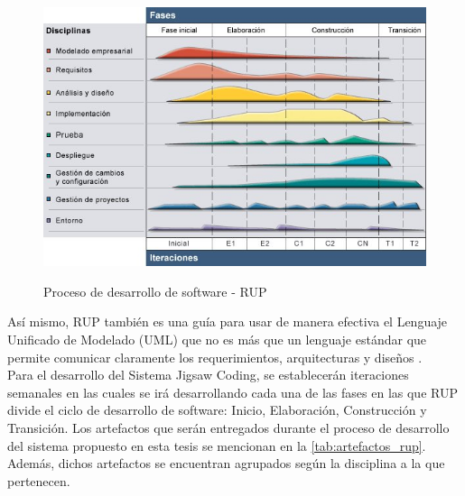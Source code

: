\begin{figure}[!h]
  \centering
  \includegraphics[scale=0.7]{figuras/rup.jpg}\\
  \caption[RUP]{Proceso de desarrollo de software - RUP \protect\cite{rup_small}}\label{fig:rup}
\end{figure}

Así mismo, RUP también es una guía para usar de manera efectiva el Lenguaje Unificado de Modelado (UML) que no es más que un lenguaje estándar que permite comunicar claramente los requerimientos, arquitecturas y diseños \cite{rup_ibm_2014}.\\

Para el desarrollo del Sistema Jigsaw Coding, se establecerán iteraciones semanales en las cuales se irá desarrollando cada una de las fases en las que RUP divide el ciclo de desarrollo de software: Inicio, Elaboración, Construcción y Transición. Los artefactos que serán entregados durante el proceso de desarrollo del sistema propuesto en esta tesis se mencionan en la  \autoref{tab:artefactos_rup}. Además, dichos artefactos se encuentran agrupados según la disciplina a la que pertenecen.

